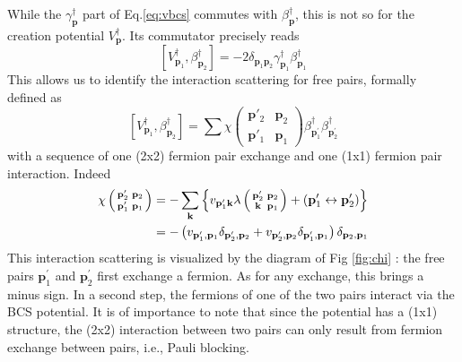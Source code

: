 \documentclass[aps,prb,superscriptaddress,twocolumn]{revtex4}
\newcommand{\vk}{\ensuremath{\mathbf{k}}}
\newcommand{\vp}{\ensuremath{\mathbf{p}}}
\begin{document}
While the $\gamma^{\dagger}_\vp$ part of Eq.\eqref{eq:vbcs} commutes with $%
\beta^{\dagger}_\vp$, this is not so for the creation potential $%
V^{\dagger}_\vp$. Its commutator precisely reads 
\begin{equation}  \label{eq:vpotbeta}
\left[V^{\dagger}_{\mathbf{p} _1},\beta^{\dagger}_{\mathbf{p} _2}\right] 
=-2\delta_{\mathbf{p} _1\mathbf{p} _2}\gamma^{\dagger}_{\mathbf{p}
_1}\beta^{\dagger}_{\mathbf{p} _1}
\end{equation}
This allows us to identify the interaction scattering for free pairs,
formally defined as 
\begin{equation}  \label{eq:vBeta}
\left[V^{\dagger}_{\mathbf{p} _1},\beta^{\dagger}_{\mathbf{p} _2}\right] 
=\sum\chi\left(\begin{smallmatrix}\vp'_2&\vp_2\\\vp'_1&\vp_1\end{smallmatrix}%
\right)  \beta^{\dagger}_{\mathbf{p} ^{\prime}_1}\beta^{\dagger}_{\mathbf{p}
^{\prime}_2}
\end{equation}
with a sequence of one (2x2) fermion pair exchange and one (1x1) fermion
pair interaction. Indeed 
\begin{equation}  \label{eq:interactSc}
\begin{split}
\chi\left(\begin{smallmatrix}\vp'_2&\vp_2\\\vp'_1&\vp_1\end{smallmatrix}%
\right)  &=-\sum_\vk\left\{v_{\mathbf{p} ^{\prime}_1\mathbf{k} }\lambda\left(%
\begin{smallmatrix}\vp'_2&\vp_2\\\vk&\vp_1\end{smallmatrix}\right)  +\left(%
\mathbf{p} ^{\prime}_1\leftrightarrow\mathbf{p} ^{\prime}_2\right) \right\} 
\\
&=-\left(v_{\mathbf{p} ^{\prime}_1,\mathbf{p} _1}\delta_{\mathbf{p}
^{\prime}_2,\mathbf{p} _2}+v_{\mathbf{p} ^{\prime}_2,\mathbf{p} _2}\delta_{%
\mathbf{p} ^{\prime}_1,\mathbf{p} _1}\right) \delta_{\mathbf{p} _2,\mathbf{p}
_1}
\end{split}%
\end{equation}
This interaction scattering is visualized by the diagram of Fig \ref{fig:chi}%
: the free pairs $\mathbf{p} ^{\prime}_1$ and $\mathbf{p} ^{\prime}_2$ first
exchange a fermion. As for any exchange, this brings a minus sign. In a
second step, the fermions of one of the two pairs interact via the BCS
potential. It is of importance to note that since the potential has a (1x1)
structure, the (2x2) interaction between two pairs can only result from
fermion exchange between pairs, i.e., Pauli blocking.
\end{document}
